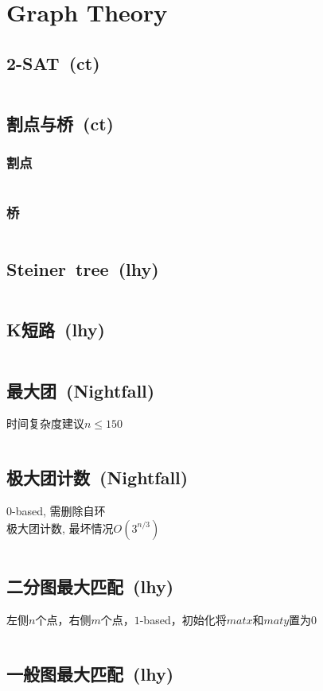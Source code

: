 \chapter{Graph Theory}
\section{2-SAT\ \small(ct)}
	\inputminted{cpp}{GraphTheory/2_sat.cpp}
\section{割点与桥\ \small(ct)}
	\subsection*{割点}
		\inputminted{cpp}{GraphTheory/cut_point.cpp}
	\subsection*{桥}
		\inputminted{cpp}{GraphTheory/bridge.cpp}
\section{Steiner\ tree\ \small(lhy)}
	\inputminted{cpp}{GraphTheory/steiner_tree.cpp}
\section{K短路\ \small(lhy)}
	\inputminted{cpp}{GraphTheory/kth_minimum_path.cpp}
\section{最大团\ \small(Nightfall)}
	时间复杂度建议$ n \leq 150 $
	\inputminted{cpp}{GraphTheory/maximum_clique.cpp}
\section{极大团计数\ \small(Nightfall)}
	$ 0 $-based, 需删除自环
	\\极大团计数, 最坏情况$ O(3^{n / 3}) $
	\inputminted{cpp}{GraphTheory/maximum_clique_count.cpp}
\section{二分图最大匹配\ \small(lhy)}
	左侧$ n $个点，右侧$ m $个点，$ 1 $-based，初始化将$ matx $和$ maty $置为$ 0 $
	\inputminted{cpp}{GraphTheory/hopcroft_karp.cpp}
\section{一般图最大匹配\ \small(lhy)}
	\inputminted{cpp}{GraphTheory/blossom.cpp}
